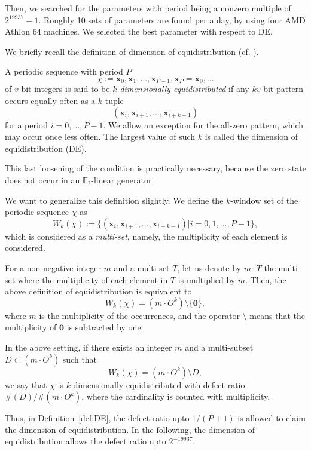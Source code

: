 \documentclass[acmnow]{acmtrans2m}
\def\F2{{\mathbb F}_2}
\def\bx{{{\mathbf x}}}
\begin{document}
Then, we searched for the parameters 
with period being a nonzero multiple of $2^{19937}-1$. 
Roughly 10 sets of parameters are found per a day,
by using four AMD Athlon 64 machines. 
We selected the best parameter with respect to DE.

We briefly recall the definition of dimension of 
equidistribution (cf. \cite{CLT}). 
\begin{definition}\label{def:DE}
A periodic sequence with period $P$
$$\chi:=\bx_0, \bx_1, \ldots, \bx_{P-1}, \bx_P=\bx_0, \ldots$$
of $v$-bit integers is said to be {\em $k$-dimensionally equidistributed}
if any $kv$-bit pattern occurs equally often as a $k$-tuple
$$
(\bx_i, \bx_{i+1}, \ldots, \bx_{i+k-1})
$$
for a period $i=0,\ldots, P-1$.
We allow an exception for 
the all-zero pattern, which may occur once less often.
The largest value of such $k$ is called the dimension 
of equidistribution (DE).
\end{definition}
This last loosening of the condition is practically 
necessary, because the zero state does not occur
in an $\F2$-linear generator. 

We want to generalize this definition slightly.
We define the $k$-window set of the periodic sequence $\chi$
as
$$
W_k(\chi):=
\{(\bx_i, \bx_{i+1}, \ldots, \bx_{i+k-1}) | 
i =0,1,\ldots, P-1\},
$$
which is considered as a {\em multi-set}, namely, 
the multiplicity of each element is considered. 

For a non-negative integer $m$ and a multi-set $T$,
let us denote by $m \cdot T$ the multi-set 
where the multiplicity of each element in $T$ is
multiplied by $m$. Then, the above definition of
equidistribution is equivalent to 
$$
W_k(\chi)=(m\cdot O^k) \setminus \{{\mathbf 0}\},
$$
where $m$ is the multiplicity of the occurrences,
and the operator $\setminus$ means that the multiplicity
of ${\mathbf 0}$ is subtracted by one. 

\begin{definition}
In the above setting, if there exists an integer $m$ 
and a multi-subset
$D \subset (m\cdot O^k)$
such that
$$
W_k(\chi)=(m\cdot O^k) \setminus D,
$$
we say that $\chi$ is $k$-dimensionally equidistributed 
with defect ratio $\#(D)/\#(m \cdot O^k)$, 
where the cardinality is counted with multiplicity. 
\end{definition}
Thus, in Definition~\ref{def:DE}, the defect ratio upto $1/(P+1)$
is allowed to claim the dimension of equidistribution. 
In the following, the dimension of equidistribution 
allows the defect ratio upto $2^{-19937}$. 
\end{document}
